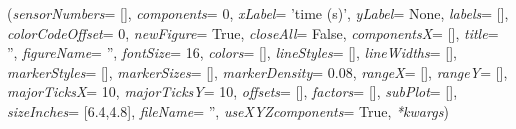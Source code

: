 %
\begin{flushleft}
\label{sec:mainsystemextensions:PlotSensor}
({\it sensorNumbers}= [], {\it components}= 0, {\it xLabel}= 'time (s)', {\it yLabel}= None, {\it labels}= [], {\it colorCodeOffset}= 0, {\it newFigure}= True, {\it closeAll}= False, {\it componentsX}= [], {\it title}= '', {\it figureName}= '', {\it fontSize}= 16, {\it colors}= [], {\it lineStyles}= [], {\it lineWidths}= [], {\it markerStyles}= [], {\it markerSizes}= [], {\it markerDensity}= 0.08, {\it rangeX}= [], {\it rangeY}= [], {\it majorTicksX}= 10, {\it majorTicksY}= 10, {\it offsets}= [], {\it factors}= [], {\it subPlot}= [], {\it sizeInches}= [6.4,4.8], {\it fileName}= '', {\it useXYZcomponents}= True, {\it **kwargs})
\end{flushleft}
\setlength{\itemindent}{0.7cm}
